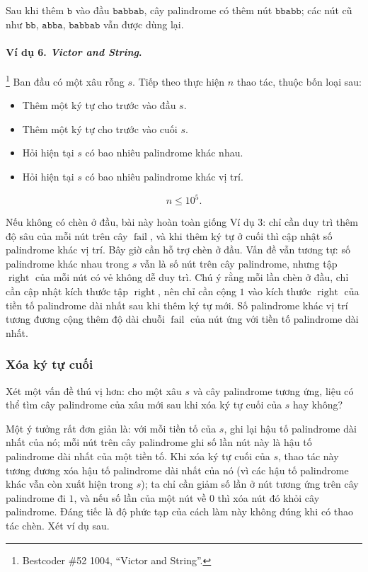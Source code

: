\documentclass[11pt]{article}
\begin{document}
\begin{center}
\small
Sau khi thêm \(\texttt{b}\) vào đầu \(\texttt{babbab}\), cây palindrome có
thêm nút \(\texttt{bbabb}\); các nút cũ như \(\texttt{bb}\),
\(\texttt{abba}\), \(\texttt{babbab}\) vẫn được dùng lại.
\end{center}

\paragraph{Ví dụ 6. \emph{Victor and String}.}
\footnote{Bestcoder \#52 1004, ``Victor and String''.}
Ban đầu có một xâu rỗng \(s\). Tiếp theo thực hiện \(n\) thao tác, thuộc bốn
loại sau:

\begin{itemize}
  \item Thêm một ký tự cho trước vào đầu \(s\).
  \item Thêm một ký tự cho trước vào cuối \(s\).
  \item Hỏi hiện tại \(s\) có bao nhiêu palindrome khác nhau.
  \item Hỏi hiện tại \(s\) có bao nhiêu palindrome khác vị trí.
\end{itemize}

\[
n\le 10^5.
\]

Nếu không có chèn ở đầu, bài này hoàn toàn giống Ví dụ 3: chỉ cần duy trì thêm
độ sâu của mỗi nút trên cây \(\operatorname{fail}\), và khi thêm ký tự ở cuối
thì cập nhật số palindrome khác vị trí. Bây giờ cần hỗ trợ chèn ở đầu. Vấn đề
vẫn tương tự: số palindrome khác nhau trong \(s\) vẫn là số nút trên cây
palindrome, nhưng tập \(\operatorname{right}\) của mỗi nút có vẻ không dễ duy
trì. Chú ý rằng mỗi lần chèn ở đầu, chỉ cần cập nhật kích thước tập
\(\operatorname{right}\), nên chỉ cần cộng \(1\) vào kích thước
\(\operatorname{right}\) của tiền tố palindrome dài nhất sau khi thêm ký tự
mới. Số palindrome khác vị trí tương đương cộng thêm độ dài chuỗi
\(\operatorname{fail}\) của nút ứng với tiền tố palindrome dài nhất.

\subsubsection{Xóa ký tự cuối}

Xét một vấn đề thú vị hơn: cho một xâu \(s\) và cây palindrome tương ứng, liệu
có thể tìm cây palindrome của xâu mới sau khi xóa ký tự cuối của \(s\) hay
không?

Một ý tưởng rất đơn giản là: với mỗi tiền tố của \(s\), ghi lại hậu tố
palindrome dài nhất của nó; mỗi nút trên cây palindrome ghi số lần nút này là
hậu tố palindrome dài nhất của một tiền tố. Khi xóa ký tự cuối của \(s\), thao
tác này tương đương xóa hậu tố palindrome dài nhất của nó (vì các hậu tố
palindrome khác vẫn còn xuất hiện trong \(s\)); ta chỉ cần giảm số lần ở nút
tương ứng trên cây palindrome đi \(1\), và nếu số lần của một nút về \(0\) thì
xóa nút đó khỏi cây palindrome. Đáng tiếc là độ phức tạp của cách làm này
không đúng khi có thao tác chèn. Xét ví dụ sau.
\end{document}

